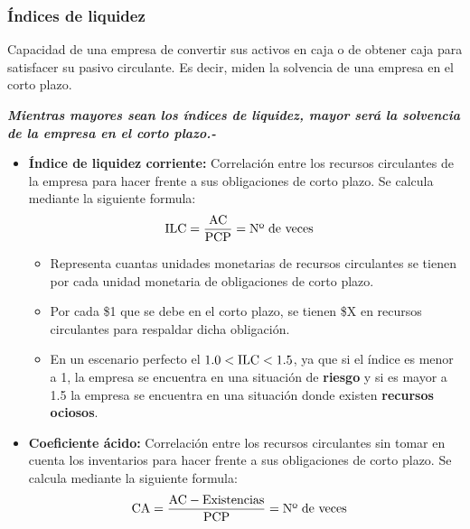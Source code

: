 \documentclass{templateNote}
\begin{document}
\subsubsection{Índices de liquidez}
\noindent Capacidad de una empresa de convertir sus activos en caja o de obtener caja para satisfacer su pasivo circulante. Es decir, miden la solvencia de una empresa en el corto plazo.

\begin{tcolorbox}[colback=orange!10!white,colframe=orange!60!black,title=Observación]
    \textit{\textbf{Mientras mayores sean los índices de liquidez, mayor será la solvencia de la empresa en el corto plazo.-}}
\end{tcolorbox}

\begin{itemize}
    \item \textbf{Índice de liquidez corriente:} Correlación entre los recursos circulantes de la empresa para hacer frente a sus obligaciones de corto plazo. Se calcula mediante la siguiente formula:
    \begin{align*}
        \textnormal{ILC} &= \frac{\textnormal{AC}}{\textnormal{PCP}} = \textnormal{Nº de veces}
    \end{align*}
    
    \begin{itemize}
        \item Representa cuantas unidades monetarias de recursos circulantes se tienen por cada unidad monetaria de obligaciones de corto plazo.
        \item Por cada \$1 que se debe en el corto plazo, se tienen \$X en recursos circulantes para respaldar dicha obligación.
        \item En un escenario perfecto el \textbf{$1.0 < \textnormal{ILC} < 1.5$}, ya que si el índice es menor a 1, la empresa se encuentra en una situación de \textbf{riesgo} y si es mayor a 1.5 la empresa se encuentra en una situación donde existen \textbf{recursos ociosos}.
    \end{itemize}

    \item \textbf{Coeficiente ácido:} Correlación entre los recursos circulantes sin tomar en cuenta los inventarios para hacer frente a sus obligaciones de corto plazo. Se calcula mediante la siguiente formula:
    \begin{align*}
        \textnormal{CA} &= \frac{\textnormal{AC} - \textnormal{Existencias}}{\textnormal{PCP}} = \textnormal{Nº de veces}
    \end{align*} 


\end{itemize}
\end{document}
